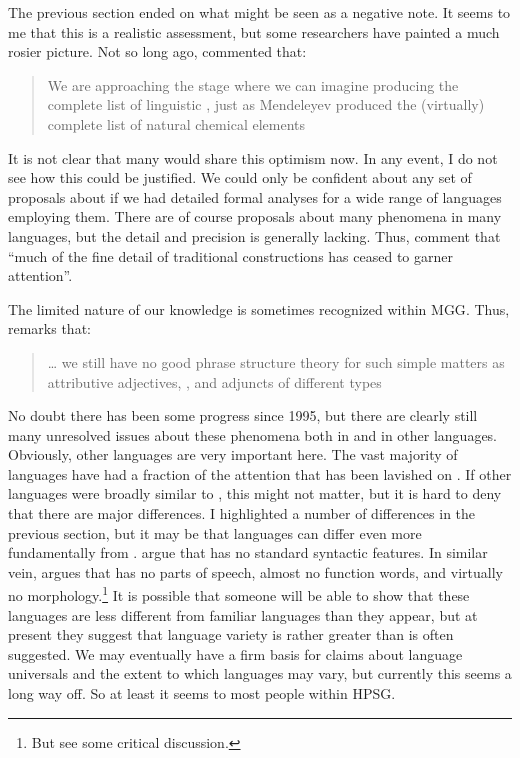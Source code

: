 \documentclass[output=paper]{langsci/langscibook}
\begin{document}
The previous section ended on what might be seen as a negative note. It seems
to me that this is a realistic assessment, but some researchers have painted a
much rosier picture. Not so long ago, \citet{Baker2001} commented that:
\blockquote[{\citealt[50]{Baker2001}}]{We are approaching the stage where we can
imagine producing the complete list of linguistic , just as
Mendeleyev produced the (virtually) complete list of natural chemical
elements}. It is not clear that many would share this optimism now. In any
event, I do not see how this could be justified. We could only be confident
about any set of proposals about  if we had detailed formal analyses
for a wide range of languages employing them. There are of course proposals
about many phenomena in many languages, but the detail and precision is
generally lacking. Thus, \citet[535]{CulJac2005} comment that \enquote{much of
the fine detail of traditional constructions has ceased to garner attention}.

The limited nature of our knowledge is sometimes recognized within \gls{MGG}.
Thus, \textcite[382, fn.\ 22]{Chomsky1995} remarks that: \blockquote{\dots{}
we still have no good phrase structure theory for such simple matters as
attributive adjectives, , and adjuncts of different types}.  No
doubt there has been some progress since 1995, but there are clearly still many
unresolved issues about these phenomena both in  and in other
languages. Obviously, other languages are very important here.  The vast
majority of languages have had a fraction of the attention that has been
lavished on . If other languages were broadly similar to , this
might not matter, but it is hard to deny that there are major differences. I
highlighted a number of differences in the previous section, but it may be that
languages can differ even more fundamentally from .
\citet{KoeMich2014} argue that  has no standard syntactic
features. In similar vein, \textcite{Gil2005,Gil2009} argues that  has no parts of speech, almost no function words, and virtually no
morphology.\footnote{But see \citet{Yoder2010} some critical discussion.} It is
possible that someone will be able to show that these languages are less
different from familiar languages than they appear, but at present they suggest
that language variety is rather greater than is often suggested. We may
eventually have a firm basis for claims about language universals and the
extent to which languages may vary, but currently this seems a long way off. So
at least it seems to most people within \gls{HPSG}.\largerpage
\end{document}
